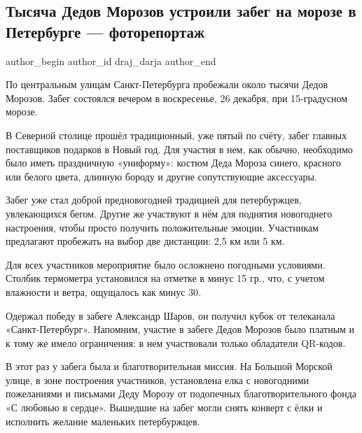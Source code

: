  
 
 
 
 
\subsection{Тысяча Дедов Морозов устроили забег на морозе в Петербурге — фоторепортаж}
\label{sec:27_12_2021.stz.news.ru.regnum.1.dedy_morozy_piter}

\ifcmt
 author_begin
   author_id draj_darja
 author_end
\fi

По центральным улицам Санкт-Петербурга пробежали около тысячи Дедов Морозов.
Забег состоялся вечером в воскресенье, 26 декабря, при 15-градусном морозе.


В Северной столице прошёл традиционный, уже пятый по счёту, забег главных
поставщиков подарков в Новый год. Для участия в нем, как обычно, необходимо
было иметь праздничную «униформу»: костюм Деда Мороза синего, красного или
белого цвета, длинную бороду и другие сопутствующие аксессуары.


Забег уже стал доброй предновогодней традицией для петербуржцев, увлекающихся
бегом. Другие же участвуют в нём для поднятия новогоднего настроения, чтобы
просто получить положительные эмоции. Участникам предлагают пробежать на выбор
две дистанции: 2,5 км или 5 км.


Для всех участников мероприятие было осложнено погодными условиями. Столбик
термометра установился на отметке в минус 15 гр., что, с учетом влажности и
ветра, ощущалось как минус 30.

Одержал победу в забеге Александр Шаров, он получил кубок от телеканала
«Санкт-Петербург». Напомним, участие в забеге Дедов Морозов было платным и к
тому же имело ограничения: в нем участвовали только обладатели QR-кодов.

В этот раз у забега была и благотворительная миссия. На Большой Морской улице,
в зоне построения участников, установлена елка с новогодними пожеланиями и
письмами Деду Морозу от подопечных благотворительного фонда «С любовью в
сердце». Вышедшие на забег могли снять конверт с ёлки и исполнить желание
маленьких петербуржцев.

